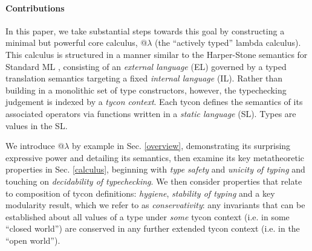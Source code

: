 \documentclass[9pt,preprint]{sigplanconf}
\begin{document}
\paragraph{Contributions} In this paper, we take substantial steps towards this goal by  constructing a minimal but powerful core calculus, @$\lambda$ (the ``actively typed'' lambda calculus). %
This calculus is structured in a manner similar to the Harper-Stone semantics for Standard ML \cite{Harper00atype-theoretic}, consisting of an \emph{external language} (EL) governed by a {typed translation semantics} targeting a fixed \emph{internal language} (IL). 
Rather than building in a monolithic set of type constructors, however, the typechecking judgement is indexed by a \emph{tycon context}. Each tycon defines the semantics of its associated operators via functions written in a \emph{static language} (SL). Types are values in the SL.%

We introduce @$\lambda$ by example in Sec. \ref{overview}, demonstrating its surprising expressive power and detailing its semantics, then examine its key metatheoretic properties in Sec. \ref{calculus}, beginning with \emph{type safety} and \emph{unicity of typing} and touching on  \emph{decidability of typechecking}. We then consider properties that relate to composition of tycon definitions: \emph{hygiene}, \emph{stability of typing} and a key modularity result, which we refer to as  \emph{conservativity}: any invariants that can be established about all values of a type under \emph{some} tycon context (i.e. in some  ``closed world'') are conserved in any further extended tycon context (i.e. in the ``open world''). 
\end{document}
